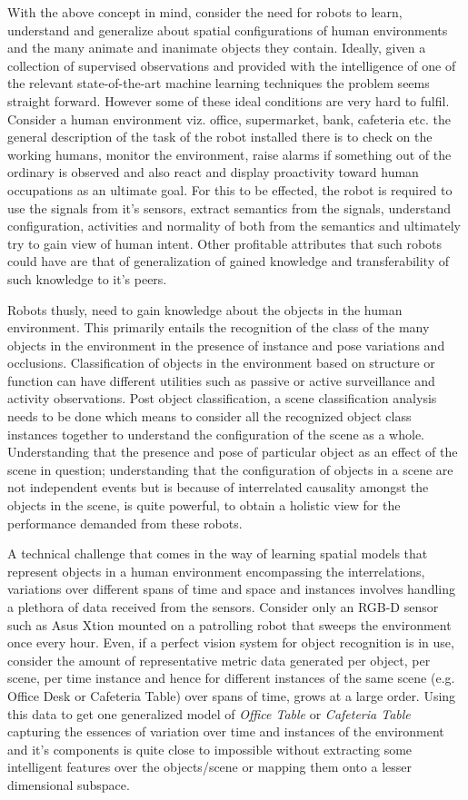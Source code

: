 \documentclass[letterpaper, 10 pt, conference]{ieeeconf}  %
\begin{document}
With the above concept in mind, consider the need for robots to learn, understand and generalize about spatial configurations of human environments and the many animate and inanimate objects they contain. Ideally, given a collection of supervised observations and provided with the intelligence of one of the relevant state-of-the-art machine learning techniques the problem seems straight forward. However some of these ideal conditions are very hard to fulfil. Consider a human environment viz. office, supermarket, bank, cafeteria etc. the general description of the task of the robot installed there is to check on the working humans, monitor the environment, raise alarms if something out of the ordinary is observed and also react and display proactivity toward human occupations as an ultimate goal. For this to be effected, the robot is required to use the signals from it's sensors, extract semantics from the signals, understand configuration, activities and normality of both from the semantics and ultimately try to gain view of human intent. Other profitable attributes that such robots could have are that of generalization of gained knowledge and transferability of such knowledge to it's peers.

Robots thusly, need to gain knowledge about the objects in the human environment. This primarily entails the recognition of the class of the many objects in the environment in the presence of instance and pose variations and occlusions. Classification of objects in the environment based on structure or function can have different utilities such as passive or active surveillance and activity observations. Post object classification, a scene classification analysis needs to be done which means to consider all the recognized object class instances together to understand the configuration of the scene as a whole. Understanding that the presence and pose of particular object as an effect of the scene in question; understanding that the configuration of objects in a scene are not independent events but is because of interrelated causality amongst the objects in the scene, is quite powerful, to obtain a holistic view for the performance demanded from these robots.

A technical challenge that comes in the way of learning spatial models that represent objects in a human environment encompassing the interrelations, variations over different spans of time and space and instances involves handling a plethora of data received from the sensors. Consider only an RGB-D sensor such as Asus Xtion mounted on a patrolling robot that sweeps the environment once every hour. Even, if a perfect vision system for object recognition is in use, consider the amount of representative metric data generated per object, per scene, per time instance and hence for different instances of the same scene (e.g. Office Desk or Cafeteria Table) over spans of time, grows at a large order. Using this data to get one generalized model of \textit{Office Table} or \textit{Cafeteria Table} capturing the essences of variation over time and instances of the environment and it's components is quite close to impossible without extracting some intelligent features over the objects/scene or mapping them onto a lesser dimensional subspace.
\end{document}
